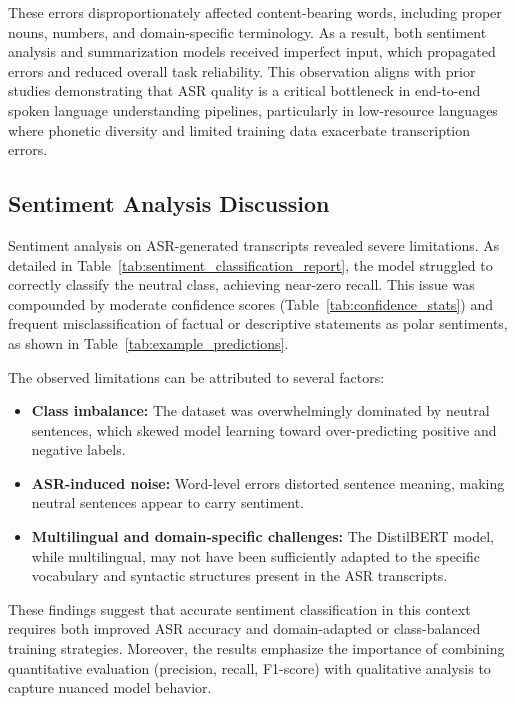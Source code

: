 These errors disproportionately affected content-bearing words, including proper nouns, numbers, and domain-specific terminology. As a result, both sentiment analysis and summarization models received imperfect input, which propagated errors and reduced overall task reliability. This observation aligns with prior studies demonstrating that ASR quality is a critical bottleneck in end-to-end spoken language understanding pipelines, particularly in low-resource languages where phonetic diversity and limited training data exacerbate transcription errors.

\subsection{Sentiment Analysis Discussion}

Sentiment analysis on ASR-generated transcripts revealed severe limitations. As detailed in Table~\ref{tab:sentiment_classification_report}, the model struggled to correctly classify the neutral class, achieving near-zero recall. This issue was compounded by moderate confidence scores (Table~\ref{tab:confidence_stats}) and frequent misclassification of factual or descriptive statements as polar sentiments, as shown in Table~\ref{tab:example_predictions}.

The observed limitations can be attributed to several factors:

\begin{itemize}
    \item \textbf{Class imbalance:} The dataset was overwhelmingly dominated by neutral sentences, which skewed model learning toward over-predicting positive and negative labels.
    \item \textbf{ASR-induced noise:} Word-level errors distorted sentence meaning, making neutral sentences appear to carry sentiment.
    \item \textbf{Multilingual and domain-specific challenges:} The DistilBERT model, while multilingual, may not have been sufficiently adapted to the specific vocabulary and syntactic structures present in the ASR transcripts.
\end{itemize}

These findings suggest that accurate sentiment classification in this context requires both improved ASR accuracy and domain-adapted or class-balanced training strategies. Moreover, the results emphasize the importance of combining quantitative evaluation (precision, recall, F1-score) with qualitative analysis to capture nuanced model behavior.


